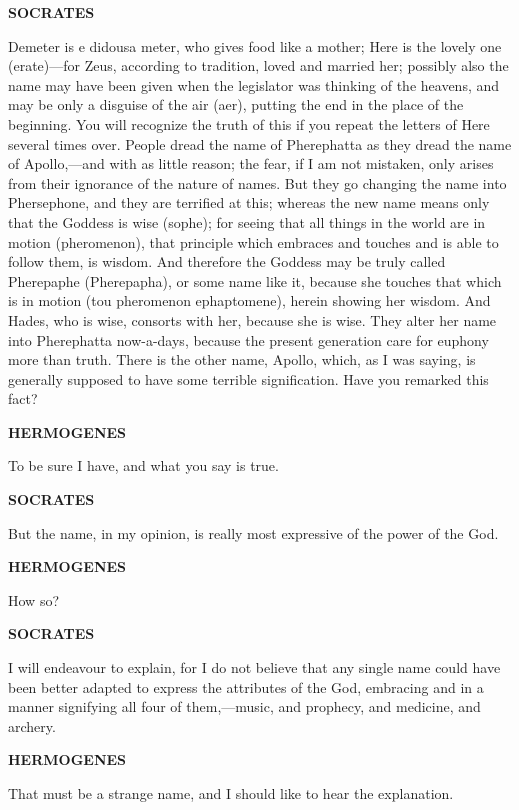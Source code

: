 \documentclass[11pt,letter]{article}
\begin{document}
\par \textbf{SOCRATES}
\par   Demeter is e didousa meter, who gives food like a mother; Here is the lovely one (erate)—for Zeus, according to tradition, loved and married her; possibly also the name may have been given when the legislator was thinking of the heavens, and may be only a disguise of the air (aer), putting the end in the place of the beginning. You will recognize the truth of this if you repeat the letters of Here several times over. People dread the name of Pherephatta as they dread the name of Apollo,—and with as little reason; the fear, if I am not mistaken, only arises from their ignorance of the nature of names. But they go changing the name into Phersephone, and they are terrified at this; whereas the new name means only that the Goddess is wise (sophe); for seeing that all things in the world are in motion (pheromenon), that principle which embraces and touches and is able to follow them, is wisdom. And therefore the Goddess may be truly called Pherepaphe (Pherepapha), or some name like it, because she touches that which is in motion (tou pheromenon ephaptomene), herein showing her wisdom. And Hades, who is wise, consorts with her, because she is wise. They alter her name into Pherephatta now-a-days, because the present generation care for euphony more than truth. There is the other name, Apollo, which, as I was saying, is generally supposed to have some terrible signification. Have you remarked this fact?

\par \textbf{HERMOGENES}
\par   To be sure I have, and what you say is true.

\par \textbf{SOCRATES}
\par   But the name, in my opinion, is really most expressive of the power of the God.

\par \textbf{HERMOGENES}
\par   How so?

\par \textbf{SOCRATES}
\par   I will endeavour to explain, for I do not believe that any single name could have been better adapted to express the attributes of the God, embracing and in a manner signifying all four of them,—music, and prophecy, and medicine, and archery.

\par \textbf{HERMOGENES}
\par   That must be a strange name, and I should like to hear the explanation.
\end{document}
